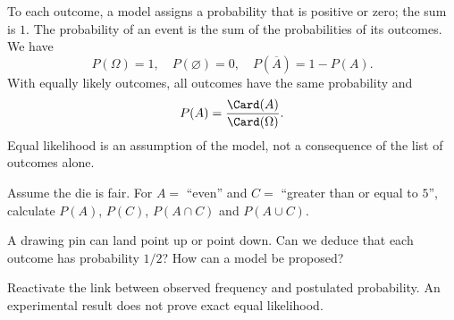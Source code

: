\begin{keypoint}
To each outcome, a model assigns a probability that is positive or zero; the sum is $1$. The probability of an event is the sum of the probabilities of its outcomes. We have
\[P(\Omega)=1,\quad P(\varnothing)=0,\quad P(\overline A)=1-P(A).\]
With equally likely outcomes, all outcomes have the same probability and
\[P(A)=\frac{\Card(A)}{\Card(\Omega)}.\]
Equal likelihood is an assumption of the model, not a consequence of the list of outcomes alone.
\end{keypoint}
\begin{example}Assume the die is fair. For $A=$ ``even'' and $C=$ ``greater than or equal to $5$'', calculate $P(A)$, $P(C)$, $P(A\cap C)$ and $P(A\cup C)$.\end{example}
\begin{example}A drawing pin can land point up or point down. Can we deduce that each outcome has probability $1/2$? How can a model be proposed?\end{example}
\begin{teachernote}Reactivate the link between observed frequency and postulated probability. An experimental result does not prove exact equal likelihood.\end{teachernote}

